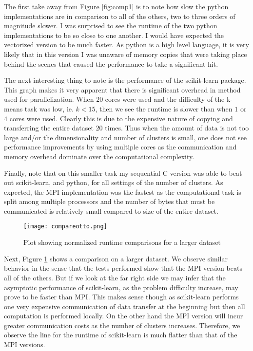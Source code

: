\documentclass[10pt,twocolumn,letterpaper]{article}
\begin{document}
The first take away from Figure \ref{fig:comp1} is to note how slow the python implementations are in comparison to all of the others, two to three orders of magnitude slower. I was surprised to see the runtime of the two python implementations to be so close to one another. I would have expected the vectorized version to be much faster. As python is a high level language, it is very likely that in this version I was unaware of memory copies that were taking place behind the scenes that caused the performance to take a significant hit.

The next interesting thing to note is the performance of the scikit-learn package. This graph makes it very apparent that there is significant overhead in method used for parallelization. When $20$ cores were used and the difficulty of the k-means task was low, ie. $k < 15$, then we see the runtime is slower than when $1$ or $4$ cores were used. Clearly this is due to the expensive nature of copying and transferring the entire dataset $20$ times. Thus when the amount of data is not too large and/or the dimensionality and number of clusters is small, one does not see performance improvements by using multiple cores as the communication and memory overhead dominate over the computational complexity. 

Finally, note that on this smaller task my sequential C version was able to beat out scikit-learn, and python, for all settings of the number of clusters. As expected, the MPI implementation was the fastest as the computational task is split among multiple processors and the number of bytes that must be communicated is relatively small compared to size of the entire dataset.

\begin{figure}[!t]
\centering
\texttt{[image: compareotto.png]}
\caption{Plot showing normalized runtime comparisons for a larger dataset}
\label{fig:comp2}
\end{figure}
Next, Figure \ref{fig:comp2} shows a comparison on a larger dataset. We observe similar behavior in the sense that the tests performed show that the MPI version beats all of the others. But if we look at the far right side we may infer that the asymptotic performance of scikit-learn, as the problem difficulty increase, may prove to be faster than MPI. This makes sense though as scikit-learn performs one very expensive communication of data transfer at the beginning but then all computation is performed locally. On the other hand the MPI version will incur greater communication costs as the number of clusters increases. Therefore, we observe the line for the runtime of scikit-learn is much flatter than that of the MPI versions. 
\end{document}
